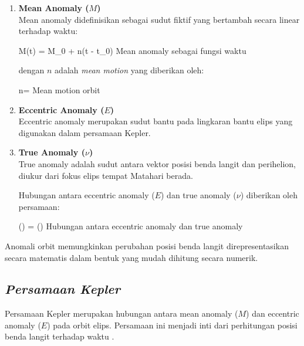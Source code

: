 \begin{enumerate}
	\item \textbf{Mean Anomaly ($M$)}\\
	Mean anomaly didefinisikan sebagai sudut fiktif yang bertambah secara linear terhadap waktu:
	
	\begin{equationcaptioned}[eq:2.meanAnomaly]{
			M(t) = M_{0} + n(t - t_{0})
		}{
			Mean anomaly sebagai fungsi waktu \cite{Meeus1998}
		}
	\end{equationcaptioned}
	
	dengan $n$ adalah \textit{mean motion} yang diberikan oleh:
	
	\begin{equationcaptioned}[eq:2.meanMotion]{
			n=
		}{
			Mean motion orbit \cite{vallado}
		}
	\end{equationcaptioned}
	
	\item \textbf{Eccentric Anomaly ($E$)}\\
	Eccentric anomaly merupakan sudut bantu pada lingkaran bantu elips yang digunakan dalam persamaan Kepler.
	
	\item \textbf{True Anomaly ($\nu$)}\\
	True anomaly adalah sudut antara vektor posisi benda langit dan perihelion, diukur dari fokus elips tempat Matahari berada.
	
	Hubungan antara eccentric anomaly ($E$) dan true anomaly ($\nu$) diberikan oleh persamaan:
	
	\begin{equationcaptioned}[eq:2.trueAnomaly]{
			\tan\left(\right)
			=
			\tan\left(\right)
		}{
			Hubungan antara eccentric anomaly dan true anomaly \cite{Meeus1998}
		}
	\end{equationcaptioned}
\end{enumerate}

Anomali orbit memungkinkan perubahan posisi benda langit direpresentasikan secara matematis dalam bentuk yang mudah dihitung secara numerik.


\subsection{\textit{Persamaan Kepler}} \label{II.TeoriPersamaanKepler}

Persamaan Kepler merupakan hubungan antara mean anomaly ($M$) dan eccentric anomaly ($E$) pada orbit elips. Persamaan ini menjadi inti dari perhitungan posisi benda langit terhadap waktu \cite{Meeus1998}.

